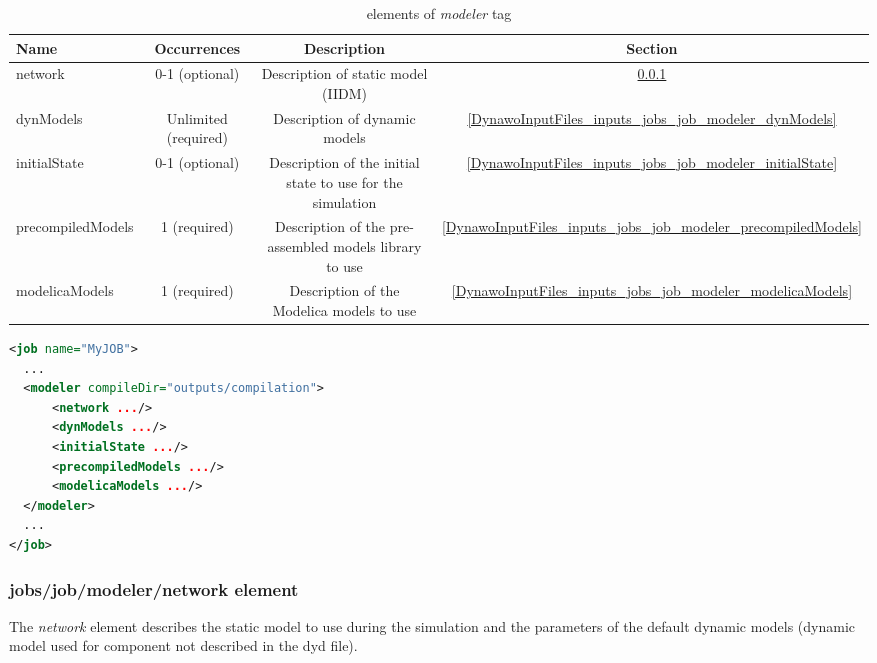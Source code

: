 \documentclass[a4paper, 12pt]{report}
\begin{document}
\begin{table}[H]
\center
\begin{tabular}{ l | c | c | c }
\toprule
\textbf{{Name}} & \textbf{{Occurrences}} & \textbf{{Description}}& \textbf{{Section}}\\
\midrule
\rowcolor{white}
\small{network} & \small{0-1 (optional)} & \small{Description of static model (IIDM)}  & \ref{DynawoInputFiles_inputs_jobs_job_modeler_network}\\
\rowcolor{gray!10}
\small{dynModels} & \small{Unlimited (required)} & \small{Description of dynamic models}  & \ref{DynawoInputFiles_inputs_jobs_job_modeler_dynModels}\\
\rowcolor{white}
\small{initialState} & \small{0-1 (optional)} & \small{Description of the initial state to use for the simulation}  & \ref{DynawoInputFiles_inputs_jobs_job_modeler_initialState}\\
\rowcolor{gray!10}
\small{precompiledModels} & \small{1 (required)} & \small{Description of the pre-assembled models library to use}  & \ref{DynawoInputFiles_inputs_jobs_job_modeler_precompiledModels}\\
\rowcolor{white}
\small{modelicaModels} & \small{1 (required)} & \small{Description of the Modelica models to use}  & \ref{DynawoInputFiles_inputs_jobs_job_modeler_modelicaModels}\\
\bottomrule
\end{tabular}
\caption{elements of \textit{modeler} tag}
\end{table}

\begin{lstlisting}[language=XML, morekeywords={network, dynModels, initialState, precompiledModels, modelicaModels}]
<job name="MyJOB">
  ...
  <modeler compileDir="outputs/compilation">
      <network .../>
      <dynModels .../>
      <initialState .../>
      <precompiledModels .../>
      <modelicaModels .../>
  </modeler>
  ...
</job>
\end{lstlisting}

\subsubsection{jobs/job/modeler/network element}
\label{DynawoInputFiles_inputs_jobs_job_modeler_network}

The \textit{network} element describes the static model to use during the simulation and the parameters of the default dynamic models (dynamic model used for component not described in the dyd file).
\end{document}
